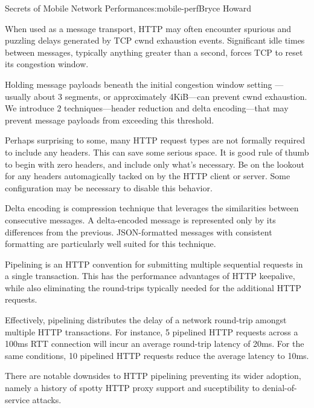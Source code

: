 \begin{aosachapter}{Secrets of Mobile Network Performance}{s:mobile-perf}{Bryce Howard}


When used as a message transport, HTTP may often encounter spurious and
puzzling delays generated by TCP cwnd exhaustion events. Significant
idle times between messages, typically anything greater than a second,
forces TCP to reset its congestion window.

Holding message payloads beneath the initial congestion window setting
---usually about 3 segments, or approximately 4KiB---can prevent cwnd
exhaustion. We introduce 2 techniques---header reduction and delta
encoding---that may prevent message payloads from exceeding this
threshold.


Perhaps surprising to some, many HTTP request types are not formally
required to include any headers. This can save some serious space. It is
good rule of thumb to begin with zero headers, and include only what's
necessary. Be on the lookout for any headers automagically
tacked on by the HTTP client or server. Some configuration may be
necessary to disable this behavior.


Delta encoding is compression technique that leverages the similarities
between consecutive messages. A delta-encoded message is represented
only by its differences from the previous. JSON-formatted messages with
consistent formatting are particularly well suited for this technique.


Pipelining is an HTTP convention for submitting multiple sequential
requests in a single transaction. This has the performance advantages of
HTTP keepalive, while also eliminating the round-trips typically needed
for the additional HTTP requests.


Effectively, pipelining distributes the delay of a network round-trip
amongst multiple HTTP transactions. For instance, 5 pipelined HTTP
requests across a 100ms RTT connection will incur an average round-trip
latency of 20ms. For the same conditions, 10 pipelined HTTP requests
reduce the average latency to 10ms.

There are notable downsides to HTTP pipelining preventing its wider
adoption, namely a history of spotty HTTP proxy support and
suceptibility to denial-of-service attacks.


\end{aosachapter}
